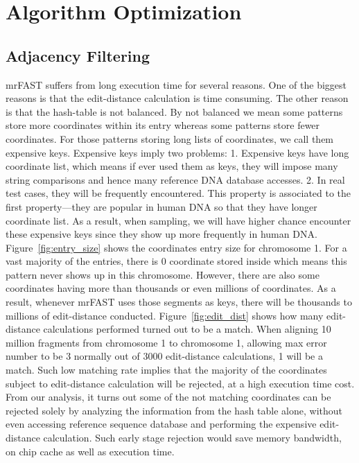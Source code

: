 \section{Algorithm Optimization} \label{sec:algorithm}

\subsection{Adjacency Filtering} \label{sec:af} 

mrFAST suffers from long execution time for several reasons. One of the biggest
reasons is that the edit-distance calculation is time consuming. The other
reason is that the hash-table is not balanced. By not balanced we mean some
patterns store more coordinates within its entry whereas some patterns store
fewer coordinates. For those patterns storing long lists of coordinates, we
call them expensive keys.  Expensive keys imply two problems: 1. Expensive keys
have long coordinate list, which means if ever used them as keys, they will
impose many string comparisons and hence many reference DNA database accesses.
2. In real test cases, they will be frequently encountered. This property is
associated to the first property—they are popular in human DNA so that they
have longer coordinate list. As a result, when sampling, we will have higher
chance encounter these expensive keys since they show up more frequently in
human DNA. \\
 
Figure~\ref{fig:entry_size} shows the coordinates entry size for chromosome 1.
For a vast majority of the entries, there is 0 coordinate stored inside which
means this pattern never shows up in this chromosome. However, there are also
some coordinates having more than thousands or even millions of coordinates. As
a result, whenever mrFAST uses those segments as keys, there will be thousands
to millions of edit-distance conducted.  Figure~\ref{fig:edit_dist} shows how many
edit-distance calculations performed turned out to be a match. When aligning 10
million fragments from chromosome 1 to chromosome 1, allowing max error number
to be 3 normally out of 3000 edit-distance calculations, 1 will be a match.
Such low matching rate implies that the majority of the coordinates subject to
edit-distance calculation will be rejected, at a high execution time cost.
From our analysis, it turns out some of the not matching coordinates can be
rejected solely by analyzing the information from the hash table alone, without
even accessing reference sequence database and performing the expensive
edit-distance calculation. Such early stage rejection would save memory
bandwidth, on chip cache as well as execution time.\\

